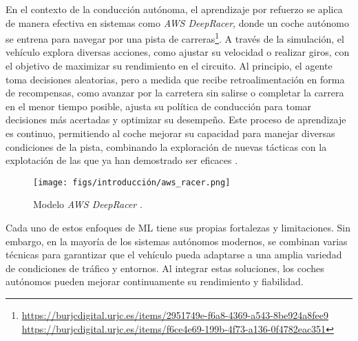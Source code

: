 En el contexto de la conducción autónoma, el aprendizaje por refuerzo se aplica de manera efectiva en sistemas como \textit{AWS DeepRacer}, donde un coche autónomo se entrena para navegar por una pista de carreras\footnote{\url{https://burjcdigital.urjc.es/items/2951749e-f6a8-4369-a543-8be924a8fee9}\\ \url{https://burjcdigital.urjc.es/items/f6ce4e69-199b-4f73-a136-0f4782eac351}}. A través de la simulación, el vehículo explora diversas acciones, como ajustar su velocidad o realizar giros, con el objetivo de maximizar su rendimiento en el circuito. Al principio, el agente toma decisiones aleatorias, pero a medida que recibe retroalimentación en forma de recompensas, como avanzar por la carretera sin salirse o completar la carrera en el menor tiempo posible, ajusta su política de conducción para tomar decisiones más acertadas y optimizar su desempeño. Este proceso de aprendizaje es continuo, permitiendo al coche mejorar su capacidad para manejar diversas condiciones de la pista, combinando la exploración de nuevas tácticas con la explotación de las que ya han demostrado ser eficaces \cite{aws-deep-racer}.

\begin{figure}[ht]
\begin{center}
\texttt{[image: figs/introducción/aws\_racer.png]}
\end{center}
\caption{Modelo \textit{AWS DeepRacer} \cite{aws-deepracer}.}
\label{aws}
\end{figure}

Cada uno de estos enfoques de \ac{ML} tiene sus propias fortalezas y limitaciones. Sin embargo, en la mayoría de los sistemas autónomos modernos, se combinan varias técnicas para garantizar que el vehículo pueda adaptarse a una amplia variedad de condiciones de tráfico y entornos. Al integrar estas soluciones, los coches autónomos pueden mejorar continuamente su rendimiento y fiabilidad.

